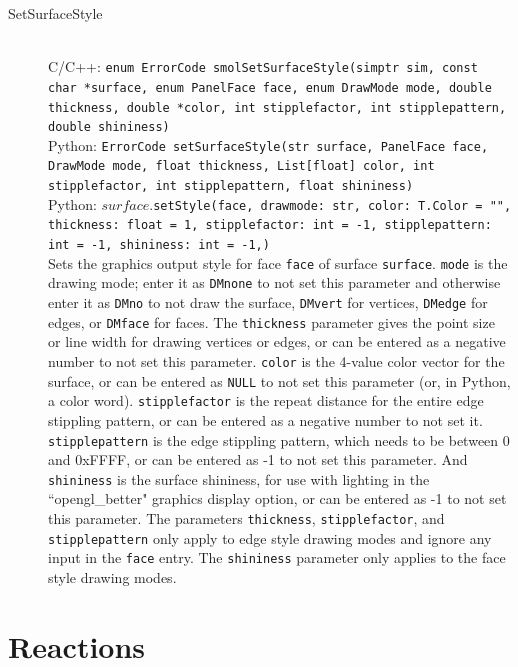 \documentclass {scrbook}
\newcommand {\ttt} {\texttt}
\begin{document}
\begin{description}
\item[SetSurfaceStyle]
\hfill \\
C/C++: \ttt{enum ErrorCode smolSetSurfaceStyle(simptr sim, const char *surface, enum PanelFace face, enum DrawMode mode, double thickness, double *color, int stipplefactor, int stipplepattern, double shininess)}\\
Python: \ttt{ErrorCode setSurfaceStyle(str surface, PanelFace face, DrawMode mode, float thickness, List[float] color, int stipplefactor, int stipplepattern, float shininess)}\\
Python: $surface$.\ttt{setStyle(face, drawmode: str, color: T.Color = "", thickness: float = 1, stipplefactor: int = -1, stipplepattern: int = -1, shininess: int = -1,)}\\
Sets the graphics output style for face \ttt{face} of surface \ttt{surface}. \ttt{mode} is the drawing mode; enter it as \ttt{DMnone} to not set this parameter and otherwise enter it as \ttt{DMno} to not draw the surface, \ttt{DMvert} for vertices, \ttt{DMedge} for edges, or \ttt{DMface} for faces. The \ttt{thickness} parameter gives the point size or line width for drawing vertices or edges, or can be entered as a negative number to not set this parameter. \ttt{color} is the 4-value color vector for the surface, or can be entered as \ttt{NULL} to not set this parameter (or, in Python, a color word). \ttt{stipplefactor} is the repeat distance for the entire edge stippling pattern, or can be entered as a negative number to not set it. \ttt{stipplepattern} is the edge stippling pattern, which needs to be between 0 and 0xFFFF, or can be entered as -1 to not set this parameter. And \ttt{shininess} is the surface shininess, for use with lighting in the ``opengl\_better" graphics display option, or can be entered as -1 to not set this parameter. The parameters \ttt{thickness}, \ttt{stipplefactor}, and \ttt{stipplepattern} only apply to edge style drawing modes and ignore any input in the \ttt{face} entry. The \ttt{shininess} parameter only applies to the face style drawing modes.

\end{description}

\section{Reactions}
\end{document}
